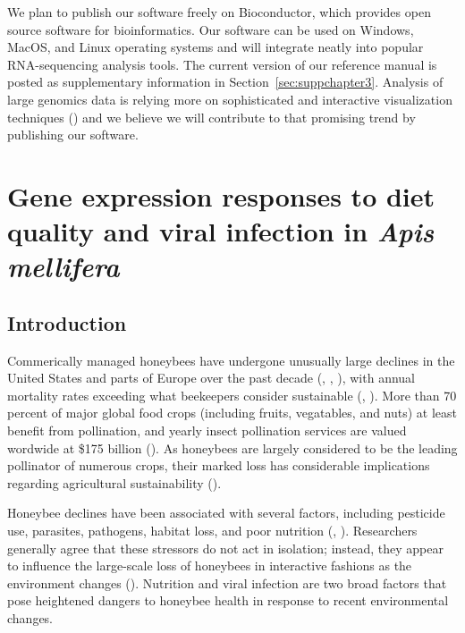 \documentclass[11pt,a4paper,oldfontcommands,openany]{memoir}
\numberwithin{equation}{section} %
\begin{document}
We plan to publish our software freely on Bioconductor, which provides open source software for bioinformatics. Our software can be used on Windows, MacOS, and Linux operating systems and will integrate neatly into popular RNA-sequencing analysis tools. The current version of our reference manual is posted as supplementary information in Section~\ref{sec:suppchapter3}. Analysis of large genomics data is relying more on sophisticated and interactive visualization techniques (\citealt{vizReview}) and we believe we will contribute to that promising trend by publishing our software.


\chapter{Gene expression responses to diet quality and viral infection in \textit{Apis mellifera}}
\label{sec:chapter4}

\section{Introduction}

Commerically managed honeybees have undergone unusually large declines in the United States and parts of Europe over the past decade (\citealt{ccd1}, \citealt{ccd2}, \citealt{ccd3}), with annual mortality rates exceeding what beekeepers consider sustainable (\citealt{ccd5}, \citealt{ccd6}). More than 70 percent of major global food crops (including fruits, vegatables, and nuts) at least benefit from pollination, and yearly insect pollination services are valued wordwide at \$175 billion (\citealt{ccd7}). As honeybees are largely considered to be the leading pollinator of numerous crops, their marked loss has considerable implications regarding agricultural sustainability (\citealt{ccd4}).

Honeybee declines have been associated with several factors, including pesticide use, parasites, pathogens, habitat loss, and poor nutrition (\citealt{factors}, \citealt{factors2}). Researchers generally agree that these stressors do not act in isolation; instead, they appear to influence the large-scale loss of honeybees in interactive fashions as the environment changes (\citealt{interacting}). Nutrition and viral infection are two broad factors that pose heightened dangers to honeybee health in response to recent environmental changes.
\end{document}
